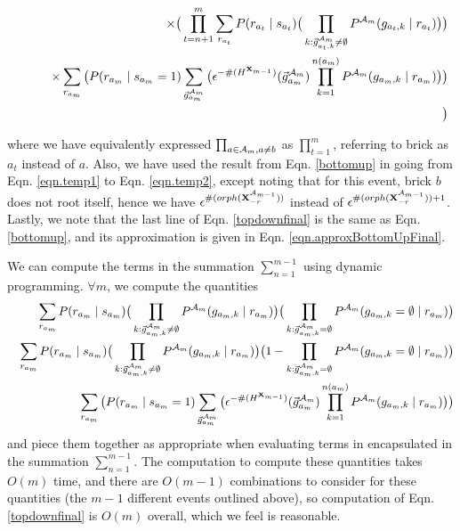 \documentclass[11pt]{article}
\newcommand{\A}{{\cal A}}
\newcommand{\X}{\mathbf{X}}
\newcommand{\XrmPrev}{\X^{\A_{m-1}}_{-r}}
\newcommand{\Am}{\A_{m}}
\begin{document}
\begin{eqnarray}
& & \qquad \times \big( \prod_{t=n+1}^{m} \sum_{r_{a_t}} P(r_{a_t} \mid s_{a_t}) \big( \prod_{k : \vec{g}^{\Am}_{a_t,k} \neq \emptyset} P^{\Am}(g_{{a_t},k} \mid r_{a_t}) \big) \big) \nonumber \\
& & \qquad \times \sum_{r_{a_m}} \big(P(r_{a_m} \mid s_{a_m} = 1) \sum_{\vec{g}^{\Am}_{{a_m}}} \big( \epsilon^{-\#(H^{\X_{m-1}})}(\vec{g}^{\Am}_{a_m}) \prod_{k=1}^{n({a_m})} P^{\Am}(g_{{a_m},k} \mid r_{a_m}) \big) \big) \nonumber \\
& & \big) \nonumber
\end{eqnarray}

where we have equivalently expressed $\prod_{a \in \Am, a \neq b}$ as $\prod_{t=1}^m$, referring to brick as $a_t$ instead of $a$. Also, we have used the result from Eqn. \ref{bottomup} in going from Eqn. \ref{eqn.temp1} to Eqn. \ref{eqn.temp2}, except noting that for this event, brick $b$ does not root itself, hence we have $\epsilon^{\#(orph(\XrmPrev))}$ instead of $\epsilon^{\#(orph(\XrmPrev))+1}$. Lastly, we note that the last line of Eqn. \ref{topdownfinal} is the same as Eqn. \ref{bottomup}, and its approximation is given in Eqn. \ref{eqn.approxBottomUpFinal}.

We can compute the terms in the summation $\sum_{n=1}^{m-1}$ using dynamic programming. $\forall m$, we compute the quantities
%
\begin{eqnarray}
& &\sum_{r_{a_m}} P(r_{a_m} \mid s_{a_m}) \big( \prod_{k : \vec{g}^{\Am}_{a_m,k} \neq \emptyset} P^{\Am}(g_{{a_m},k} \mid r_{a_m}) \big) \big( \prod_{k : \vec{g}^{\Am}_{a_m,k} = \emptyset} P^{\Am}(g_{{a_m},k} = \emptyset \mid r_{a_m}) \big) \\
%
& & \sum_{r_{a_m}} P(r_{a_m} \mid s_{a_m}) \big( \prod_{k : \vec{g}^{\Am}_{a_m,k} \neq \emptyset} P^{\Am}(g_{{a_m},k} \mid r_{a_m}) \big) \big( 1 - \prod_{k : \vec{g}^{\Am}_{a_m,k} = \emptyset} P^{\Am}(g_{{a_m},k} = \emptyset \mid r_{a_m}) \big) \\
%
& & \sum_{r_{a_m}} \big(P(r_{a_m} \mid s_{a_m} = 1) \sum_{\vec{g}^{\Am}_{{a_m}}} \big( \epsilon^{-\#(H^{\X_{m-1}})}(\vec{g}^{\Am}_{a_m}) \prod_{k=1}^{n({a_m})} P^{\Am}(g_{{a_m},k} \mid r_{a_m}) \big) \big)
\end{eqnarray}
%
and piece them together as appropriate when evaluating terms in encapsulated in the summation $\sum_{n=1}^{m-1}$. The computation to compute these quantities takes  $O(m)$ time, and there are $O(m-1)$ combinations to consider for these quantities (the $m-1$ different events outlined above), so computation of Eqn. \ref{topdownfinal} is $O(m)$ overall, which we feel is reasonable.
%


\end{document}
